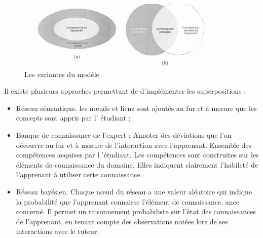 \begin{figure}
    \centering
    \includegraphics[width=0.9\textwidth]{figures/mdele.png}
    \captionsetup{justification=centering}
    \caption{Les variantes du modèle}
\end{figure}

Il existe plusieurs approches permettant de d'implémenter les superpositions :
 
\begin{itemize}
\item Réseau sémantique. les nœuds et liens sont ajoutés au fur et à mesure que les concepts sont appris par l' étudiant ; 
\item Banque de connaissance de l’expert :  Annoter des déviations que l'on découvre au fur et à mesure de l'interaction avec l'apprenant. 
Ensemble des compétences acquises par l 'étudiant.  Les compétences sont construites sur les éléments de connaissance du domaine. Elles indiquent clairement l'habileté de l'apprenant à utiliser cette connaissance. 
\item Réseau bayésien. Chaque nœud du réseau a une valeur aléatoire qui indique la probabilité que l'apprenant connaisse l'élément de connaissance. ance concerné. Il permet un raisonnement probabiliste sur l'état des connaissances de l'apprenant, en tenant compte des observations notées lors de ses interactions avec le tuteur.
\end{itemize}
 
